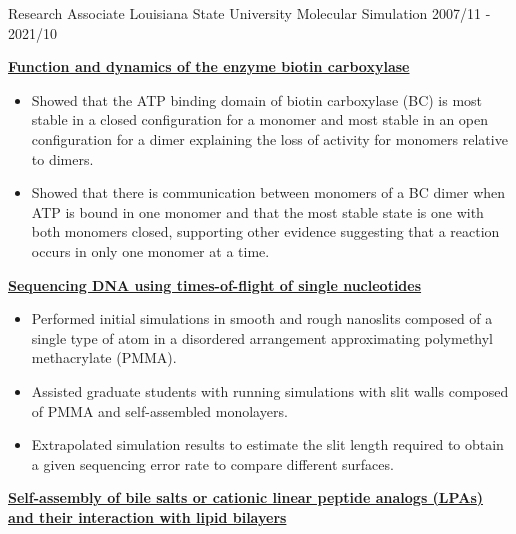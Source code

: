 \pagebreak


\begin{cventries}
  \cventry
    {Research Associate} %
    {Louisiana State University} %
    {Molecular Simulation} %
    {2007/11 - 2021/10} %
    {
        \begin{cvitems} %
            \item {\textbf{\underline{Function and dynamics of the enzyme biotin carboxylase}}}
                \vspace{2pt}
                \begin{itemize}
                \item {Showed that the ATP binding domain of biotin carboxylase (BC) is most stable in a closed configuration for a monomer and most stable in an open configuration for a dimer explaining the loss of activity for monomers relative to dimers.}
                \item {Showed that there is communication between monomers of a BC dimer when ATP is bound in one monomer and that the most stable state is one with both monomers closed, supporting other evidence suggesting that a reaction occurs in only one monomer at a time.}
                \end{itemize}
            \item {\textbf{\underline{Sequencing DNA using times-of-flight of single nucleotides}}}
                \vspace{2pt}
                \begin{itemize}
                    \item {Performed initial simulations in smooth and rough nanoslits composed of a single type of atom in a disordered arrangement approximating polymethyl methacrylate (PMMA).}
                    \item {Assisted graduate students with running simulations with slit walls composed of PMMA and self-assembled monolayers.}
                    \item {Extrapolated simulation results to estimate the slit length required to obtain a given sequencing error rate to compare different surfaces.}
                \end{itemize}        
            \item {\textbf{\underline{Self-assembly of bile salts or cationic linear peptide analogs (LPAs) and their interaction with lipid bilayers}}}

\end{cvitems}}
\end{cventries}
